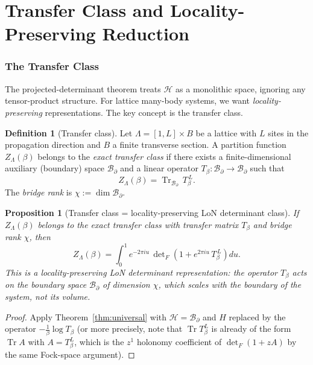 \documentclass[12pt]{article}
\theoremstyle{plain}
\newtheorem{proposition}[theorem]{Proposition}
\theoremstyle{definition}
\newtheorem{definition}[theorem]{Definition}
\numberwithin{equation}{section}
\DeclareMathOperator{\Tr}{Tr}
\begin{document}
\part{Transfer Class and Locality-Preserving Reduction}

\section{The Transfer Class}\label{sec:transfer}

The projected-determinant theorem treats $\mathcal{H}$ as a monolithic
space, ignoring any tensor-product structure.  For lattice many-body
systems, we want \emph{locality-preserving} representations.  The
key concept is the transfer class.

\begin{definition}[Transfer class]\label{def:transfer}
Let $\Lambda=[1,L]\times B$ be a lattice with $L$ sites in the
propagation direction and $B$ a finite transverse section.  A
partition function $Z_\Lambda(\beta)$ belongs to the \emph{exact
transfer class} if there exists a finite-dimensional auxiliary
(boundary) space $\mathcal{B}_\partial$ and a linear operator
$T_\beta:\mathcal{B}_\partial\to\mathcal{B}_\partial$ such that
\begin{equation}\label{eq:transfer}
Z_\Lambda(\beta) = \Tr_{\mathcal{B}_\partial}\,T_\beta^{\,L}.
\end{equation}
The \emph{bridge rank} is $\chi:=\dim\mathcal{B}_\partial$.
\end{definition}

\begin{proposition}[Transfer class = locality-preserving LoN determinant class]\label{prop:transferLoN}
If $Z_\Lambda(\beta)$ belongs to the exact transfer class with
transfer matrix $T_\beta$ and bridge rank $\chi$, then
\begin{equation}
\boxed{Z_\Lambda(\beta)
= \int_0^1 e^{-2\pi iu}\,
\det\nolimits_F\!\left(1+e^{2\pi iu}\,T_\beta^{\,L}\right)du.}
\end{equation}
This is a locality-preserving LoN determinant representation: the
operator $T_\beta$ acts on the boundary space $\mathcal{B}_\partial$
of dimension $\chi$, which scales with the \emph{boundary} of the
system, not its volume.
\end{proposition}

\begin{proof}
Apply Theorem~\ref{thm:universal} with $\mathcal{H}=\mathcal{B}_\partial$
and $H$ replaced by the operator $-\frac{1}{\beta}\log T_\beta$
(or more precisely, note that $\Tr T_\beta^L$ is already of the form
$\Tr A$ with $A=T_\beta^L$, which is the $z^1$ holonomy coefficient
of $\det_F(1+zA)$ by the same Fock-space argument).
\end{proof}
\end{document}
